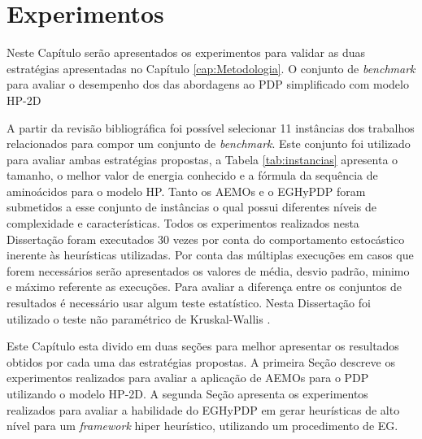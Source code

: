 \chapter{Experimentos}
\label{cap:experimentos}

Neste Capítulo serão apresentados  os experimentos para  validar as duas estratégias apresentadas no Capítulo \ref{cap:Metodologia}. 
O conjunto de \textit{benchmark} para avaliar o desempenho dos das abordagens ao PDP simplificado com modelo HP-2D


A partir da revisão bibliográfica foi possível selecionar 11 instâncias dos trabalhos relacionados \cite{unger1993genetic,krasnogor2002multimeme,shmygelska2002ant,shmygelska2003improved,hsu2003growth} para compor um conjunto de \textit{benchmark}. Este conjunto foi utilizado para avaliar ambas estratégias propostas, a Tabela \ref{tab:instancias} apresenta o tamanho, o melhor valor de energia conhecido e a fórmula da sequência de aminoácidos para o modelo HP. Tanto os AEMOs e o EGHyPDP foram submetidos a esse conjunto de instâncias o qual possui diferentes níveis de complexidade e características. Todos os experimentos realizados nesta Dissertação foram executados 30 vezes por conta do comportamento estocástico inerente às heurísticas utilizadas. Por conta das múltiplas execuções em casos que forem necessários serão apresentados os valores de média, desvio padrão, minimo e máximo referente as execuções. Para avaliar a diferença entre os conjuntos de resultados é necessário usar algum teste estatístico. Nesta Dissertação foi utilizado o teste não paramétrico de  Kruskal-Wallis \cite{mckight2010kruskal}.



Este Capítulo esta divido em duas seções para melhor apresentar os resultados obtidos por cada uma das estratégias propostas. A primeira Seção descreve os experimentos realizados para avaliar a aplicação de AEMOs para o PDP utilizando o modelo HP-2D. A segunda Seção apresenta os experimentos realizados para avaliar a habilidade do EGHyPDP em gerar heurísticas de alto nível para um \textit{framework} hiper heurístico, utilizando um procedimento de EG.




